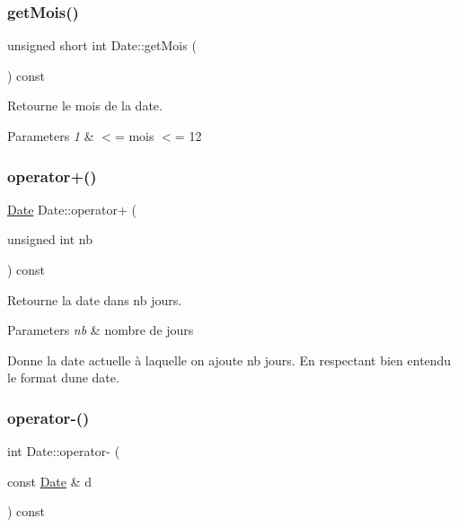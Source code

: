 \subsubsection{\texorpdfstring{get\+Mois()}{getMois()}}
{\footnotesize\ttfamily unsigned short int Date\+::get\+Mois (\begin{DoxyParamCaption}{ }\end{DoxyParamCaption}) const\hspace{0.3cm}{\ttfamily [inline]}}



Retourne le mois de la date. 


\begin{DoxyParams}{Parameters}
{\em 1} & $<$= mois $<$= 12 \\
\hline
\end{DoxyParams}
\mbox{\label{class_date_ad5cfa3a4ad369bcbc59c0fbacd775fc5}} 
\subsubsection{\texorpdfstring{operator+()}{operator+()}}
{\footnotesize\ttfamily \hyperlink{class_date}{Date} Date\+::operator+ (\begin{DoxyParamCaption}\item[{unsigned int}]{nb }\end{DoxyParamCaption}) const}



Retourne la date dans nb jours. 


\begin{DoxyParams}{Parameters}
{\em nb} & nombre de jours\\
\hline
\end{DoxyParams}
Donne la date actuelle à laquelle on ajoute nb jours. En respectant bien entendu le format d\textquotesingle{}une date. \mbox{\label{class_date_adcce792d461f182f9f3107e98029f8a8}} 
\subsubsection{\texorpdfstring{operator-\/()}{operator-()}}
{\footnotesize\ttfamily int Date\+::operator-\/ (\begin{DoxyParamCaption}\item[{const \hyperlink{class_date}{Date} \&}]{d }\end{DoxyParamCaption}) const}



